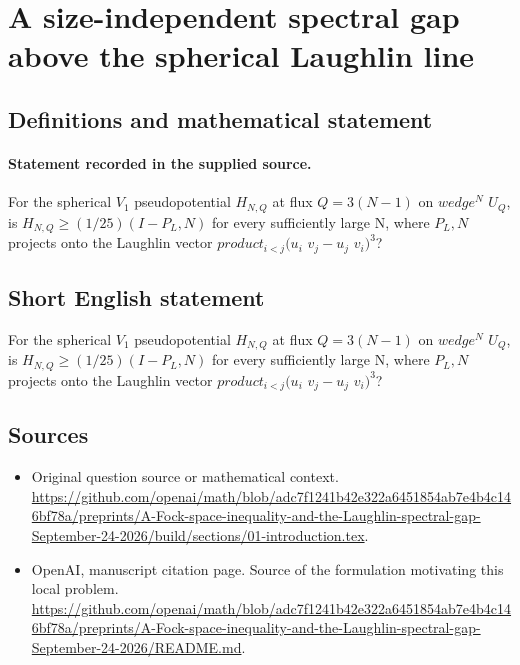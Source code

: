 \documentclass[11pt]{article}
\begin{document}
\section*{A size-independent spectral gap above the spherical Laughlin line}\label{30007232}
\subsection{Definitions and mathematical statement}
\paragraph{Statement recorded in the supplied source.}
For the spherical $V_1$ pseudopotential $H_{N,Q}$ at flux $Q=3(N-1)$ on $wedge^N$ $U_Q$, is $H_{N,Q}\geq (1/25)(I-P_L,N)$ for every sufficiently large N, where $P_L,N$ projects onto the Laughlin vector $product_{i<j}(u_i$ $v_j-u_j$ $v_i)^3$?
\subsection{Short English statement}
For the spherical $V_1$ pseudopotential $H_{N,Q}$ at flux $Q=3(N-1)$ on $wedge^N$ $U_Q$, is $H_{N,Q}\geq (1/25)(I-P_L,N)$ for every sufficiently large N, where $P_L,N$ projects onto the Laughlin vector $product_{i<j}(u_i$ $v_j-u_j$ $v_i)^3$?
\subsection{Sources}
\begin{itemize}
\item[S1] Original question source or mathematical context.
\url{https://github.com/openai/math/blob/adc7f1241b42e322a6451854ab7e4b4c146bf78a/preprints/A-Fock-space-inequality-and-the-Laughlin-spectral-gap-September-24-2026/build/sections/01-introduction.tex}.
\item[S2] OpenAI, manuscript citation page. Source of the formulation motivating this local problem.
\url{https://github.com/openai/math/blob/adc7f1241b42e322a6451854ab7e4b4c146bf78a/preprints/A-Fock-space-inequality-and-the-Laughlin-spectral-gap-September-24-2026/README.md}.
\end{itemize}
\end{document}
